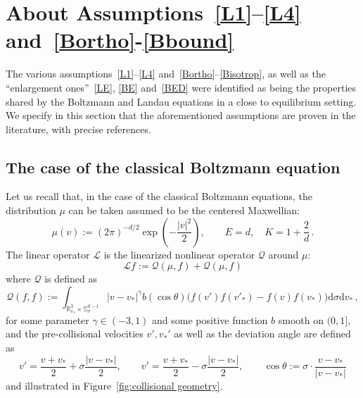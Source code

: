 \documentclass[AHL,Unicode,longabstracts,published]{cedram}
\renewcommand{\d}{\mathrm{d}}
\newcommand{\R}{\mathbb{R}}
\renewcommand{\S}{\mathbb{S}}
\newcommand{\LL}{\mathcal{L}}
\newcommand{\QQ}{\mathcal{Q}}
\begin{document}
\appendix
\section{About Assumptions~\ref{L1}--\ref{L4} and~\ref{Bortho}-\ref{Bbound}}\label{sec:Landau-Boltz}

The various assumptions~\eqref{L1}--\eqref{L4} and~\eqref{Bortho}--\eqref{Bisotrop}, as well as the ``enlargement ones''~\eqref{LE}, \eqref{BE} and~\eqref{BED} were identified as being the properties shared by the Boltzmann and Landau equations in a close to equilibrium setting. We specify in this section that the aforementioned assumptions are proven in the literature, with precise references.

\subsection{The case of the classical Boltzmann equation}

Let us recall that, in the case of the classical Boltzmann equations, the distribution $\mu$ can be taken assumed to be the centered Maxwellian:
\[
\mu(v) := (2 \pi)^{-d/2} \exp\left(- \frac{|v|^2}{2} \right), \qquad E = d, \quad K = 1 + \frac{2}{d} \,.
\]
The linear operator $\LL$ is the linearized nonlinear operator $\QQ$ around $\mu$:
\[
\LL f := \QQ(\mu, f) + \QQ(\mu, f)
\]
where $\QQ$ is defined as
\[
\QQ(f, f) := \int_{\R^3_{v_*} \times \S^{d-1}_\sigma } | v - v_* |^\gamma b(\cos \theta) \Big(f(v') f(v'_*) - f(v) f(v_*) \Big) \d \sigma \d v_* \,,
\]
for some parameter $\gamma \in (-3, 1)$ and some positive function $b$ smooth on $(0, 1]$, and the pre-collisional velocities $v', v_*'$ as well as the deviation angle are defined as
\[
v' = \frac{v+v_*}{2} + \sigma \frac{|v - v_* |}{2}, \qquad v' = \frac{v+v_*}{2} - \sigma \frac{|v - v_* |}{2}, \qquad \cos \theta := \sigma \cdot \frac{v-v_*}{ | v - v_* | }
\]
and illustrated in Figure~\ref{fig:collisional geometry}.
\end{document}

